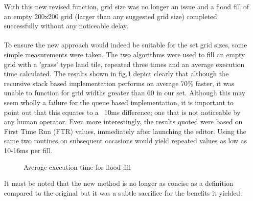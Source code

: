 With this new revised function, grid size was no longer an issue and a flood fill of an empty 200x200 grid (larger than any suggested grid size) completed successfully without any noticeable delay.
\paragraph{}
To ensure the new approach would indeed be suitable for the set grid sizes, some simple measurements were taken. The two algorithms were used to fill an empty grid with a 'grass' type land tile, repeated three times and an average execution time calculated. The results shown in fig.\ref{fig:floodChart} depict clearly that although the recursive stack based implementation performs on average 70\% faster, it was unable to function for grid widths greater than 60 in our set. Although this may seem wholly a failure for the queue based implementation, it is important to point out that this equates to a ~10ms difference; one that is not noticeable by any human operator.  Even more interestingly, the results quoted were based on First Time Run (FTR) values, immediately after launching the editor. Using the same two routines on subsequent occasions would yield repeated values as low as 10-16ms per fill.
 
\begin{figure}[h]
\centering
{}
\caption{Average execution time for flood fill}
\label{fig:floodChart}
\end{figure}

It must be noted that the new method is no longer as concise as a definition compared to the original but it was a subtle sacrifice for the benefits it yielded.



